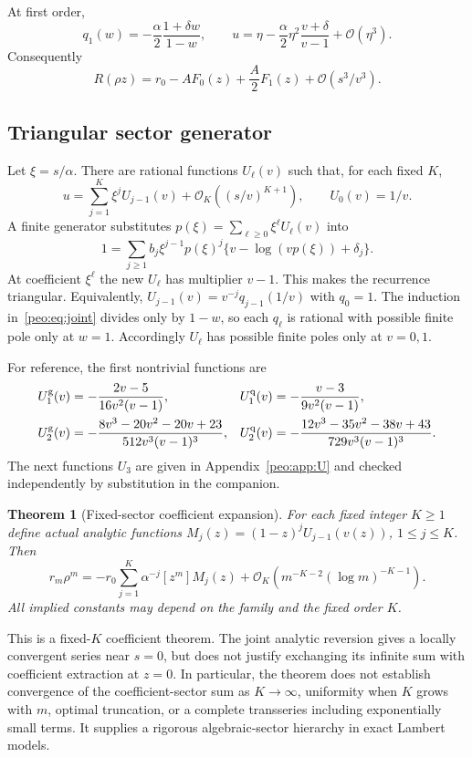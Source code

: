 \documentclass[11pt]{article}
\numberwithin{equation}{section}
\newtheorem{theorem}{Theorem}[section]
\theoremstyle{remark}\newtheorem{remark}[theorem]{Remark}
\newcommand{\Oh}{\mathcal O}
\begin{document}
At first order,
\begin{equation}
 q_1(w)=-\frac\alpha2\frac{1+\delta w}{1-w},\qquad
 u=\eta-\frac\alpha2\eta^2\frac{v+\delta}{v-1}+\Oh(\eta^3).
\end{equation}
Consequently
\begin{equation}
 R(\rho z)=r_0-AF_0(z)+\frac A2F_1(z)+\Oh(s^3/v^3).
 \label{peo:eq:localtwo}
\end{equation}

\subsection{Triangular sector generator}
Let $\xi=s/\alpha$. There are rational functions $U_\ell(v)$ such that, for each fixed $K$,
\begin{equation}
 u=\sum_{j=1}^K\xi^jU_{j-1}(v)+\Oh_K((s/v)^{K+1}),\qquad U_0(v)=1/v.
 \label{peo:eq:Usectors}
\end{equation}
A finite generator substitutes $p(\xi)=\sum_{\ell\ge0}\xi^\ell U_\ell(v)$ into
\begin{equation}
 1=\sum_{j\ge1}b_j\xi^{j-1}p(\xi)^j
 \{v-\log(vp(\xi))+\delta_j\}.
 \label{peo:eq:Ugenerator}
\end{equation}
At coefficient $\xi^\ell$ the new $U_\ell$ has multiplier $v-1$. This makes the recurrence triangular. Equivalently,
$U_{j-1}(v)=v^{-j}q_{j-1}(1/v)$ with $q_0=1$.
The induction in~\eqref{peo:eq:joint} divides only by $1-w$, so each $q_\ell$ is rational with possible finite pole only at $w=1$. Accordingly $U_\ell$ has possible finite poles only at $v=0,1$.

For reference, the first nontrivial functions are
\begin{align}
 U_1^{\rm g}(v)&=-\frac{2v-5}{16v^2(v-1)},&
 U_1^{\rm q}(v)&=-\frac{v-3}{9v^2(v-1)},\nonumber\\
 U_2^{\rm g}(v)&=-\frac{8v^3-20v^2-20v+23}{512v^3(v-1)^3},&
 U_2^{\rm q}(v)&=-\frac{12v^3-35v^2-38v+43}{729v^3(v-1)^3}.
 \label{peo:eq:Uexplicit}
\end{align}
The next functions $U_3$ are given in Appendix~\ref{peo:app:U} and checked independently by substitution in the companion.

\begin{theorem}[Fixed-sector coefficient expansion]\label{peo:thm:fixed}
For each fixed integer $K\ge1$ define actual analytic functions
$M_j(z)=(1-z)^jU_{j-1}(v(z))$, $1\le j\le K$. Then
\begin{equation}
 r_m\rho^m=-r_0\sum_{j=1}^K\alpha^{-j}[z^m]M_j(z)
 +\Oh_K\!\left(m^{-K-2}(\log m)^{-K-1}\right).
 \label{peo:eq:fixedK}
\end{equation}
All implied constants may depend on the family and the fixed order $K$.
\end{theorem}
This is a fixed-$K$ coefficient theorem. The joint analytic reversion gives a locally convergent series near $s=0$, but does not justify exchanging its infinite sum with coefficient extraction at $z=0$. In particular, the theorem does not establish convergence of the coefficient-sector sum as $K\to\infty$, uniformity when $K$ grows with $m$, optimal truncation, or a complete transseries including exponentially small terms. It supplies a rigorous algebraic-sector hierarchy in exact Lambert models.
\end{document}
